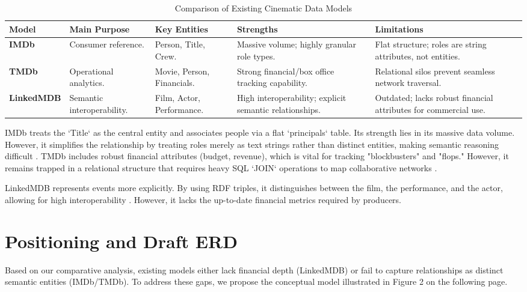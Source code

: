 \documentclass[sigconf]{acmart}
\begin{document}
\begin{table}[t]
\centering
\caption{Comparison of Existing Cinematic Data Models}
\renewcommand{\arraystretch}{1.2}
\begin{tabularx}{\textwidth}{l l X X X}
\toprule
\textbf{Model} & \textbf{Main Purpose} & \textbf{Key Entities} & \textbf{Strengths} & \textbf{Limitations} \\
\midrule
\textbf{IMDb} & Consumer reference. & Person, Title, Crew. & Massive volume; highly granular role types. & Flat structure; roles are string attributes, not entities. \\
\textbf{TMDb} & Operational analytics. & Movie, Person, Financials. & Strong financial/box office tracking capability. & Relational silos prevent seamless network traversal. \\
\textbf{LinkedMDB} & Semantic interoperability. & Film, Actor, Performance. & High interoperability; explicit semantic relationships. & Outdated; lacks robust financial attributes for commercial use. \\
\bottomrule
\end{tabularx}
\end{table}

IMDb treats the `Title` as the central entity and associates people via a flat `principals` table. Its strength lies in its massive data volume. However, it simplifies the relationship by treating roles merely as text strings rather than distinct entities, making semantic reasoning difficult \cite{imdb}. TMDb includes robust financial attributes (budget, revenue), which is vital for tracking "blockbusters" and "flops." However, it remains trapped in a relational structure that requires heavy SQL `JOIN` operations to map collaborative networks \cite{tmdb}. 

LinkedMDB represents events more explicitly. By using RDF triples, it distinguishes between the film, the performance, and the actor, allowing for high interoperability \cite{linkedmdb}. However, it lacks the up-to-date financial metrics required by producers.

\section{Positioning and Draft ERD}
Based on our comparative analysis, existing models either lack financial depth (LinkedMDB) or fail to capture relationships as distinct semantic entities (IMDb/TMDb). To address these gaps, we propose the conceptual model illustrated in Figure 2 on the following page. 
\end{document}
